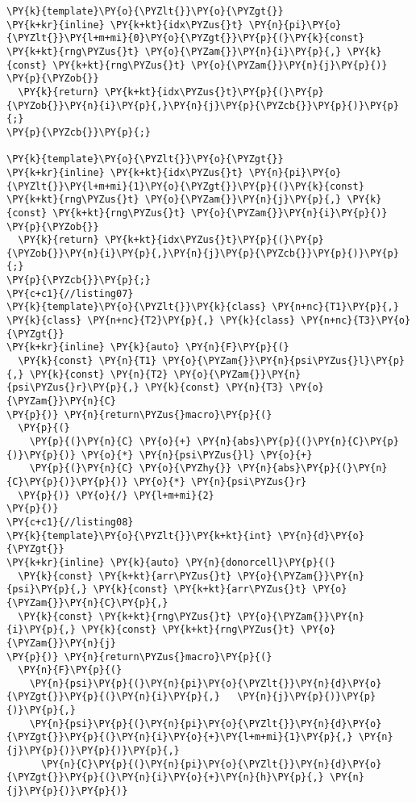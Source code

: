 \begin{Verbatim}[commandchars=\\\{\}]
\PY{k}{template}\PY{o}{\PYZlt{}}\PY{o}{\PYZgt{}}
\PY{k+kr}{inline} \PY{k+kt}{idx\PYZus{}t} \PY{n}{pi}\PY{o}{\PYZlt{}}\PY{l+m+mi}{0}\PY{o}{\PYZgt{}}\PY{p}{(}\PY{k}{const} \PY{k+kt}{rng\PYZus{}t} \PY{o}{\PYZam{}}\PY{n}{i}\PY{p}{,} \PY{k}{const} \PY{k+kt}{rng\PYZus{}t} \PY{o}{\PYZam{}}\PY{n}{j}\PY{p}{)} 
\PY{p}{\PYZob{}}
  \PY{k}{return} \PY{k+kt}{idx\PYZus{}t}\PY{p}{(}\PY{p}{\PYZob{}}\PY{n}{i}\PY{p}{,}\PY{n}{j}\PY{p}{\PYZcb{}}\PY{p}{)}\PY{p}{;}
\PY{p}{\PYZcb{}}\PY{p}{;}

\PY{k}{template}\PY{o}{\PYZlt{}}\PY{o}{\PYZgt{}}
\PY{k+kr}{inline} \PY{k+kt}{idx\PYZus{}t} \PY{n}{pi}\PY{o}{\PYZlt{}}\PY{l+m+mi}{1}\PY{o}{\PYZgt{}}\PY{p}{(}\PY{k}{const} \PY{k+kt}{rng\PYZus{}t} \PY{o}{\PYZam{}}\PY{n}{j}\PY{p}{,} \PY{k}{const} \PY{k+kt}{rng\PYZus{}t} \PY{o}{\PYZam{}}\PY{n}{i}\PY{p}{)} 
\PY{p}{\PYZob{}}
  \PY{k}{return} \PY{k+kt}{idx\PYZus{}t}\PY{p}{(}\PY{p}{\PYZob{}}\PY{n}{i}\PY{p}{,}\PY{n}{j}\PY{p}{\PYZcb{}}\PY{p}{)}\PY{p}{;}
\PY{p}{\PYZcb{}}\PY{p}{;} 
\PY{c+c1}{//listing07}
\PY{k}{template}\PY{o}{\PYZlt{}}\PY{k}{class} \PY{n+nc}{T1}\PY{p}{,} \PY{k}{class} \PY{n+nc}{T2}\PY{p}{,} \PY{k}{class} \PY{n+nc}{T3}\PY{o}{\PYZgt{}} 
\PY{k+kr}{inline} \PY{k}{auto} \PY{n}{F}\PY{p}{(}
  \PY{k}{const} \PY{n}{T1} \PY{o}{\PYZam{}}\PY{n}{psi\PYZus{}l}\PY{p}{,} \PY{k}{const} \PY{n}{T2} \PY{o}{\PYZam{}}\PY{n}{psi\PYZus{}r}\PY{p}{,} \PY{k}{const} \PY{n}{T3} \PY{o}{\PYZam{}}\PY{n}{C}
\PY{p}{)} \PY{n}{return\PYZus{}macro}\PY{p}{(}
  \PY{p}{(}
    \PY{p}{(}\PY{n}{C} \PY{o}{+} \PY{n}{abs}\PY{p}{(}\PY{n}{C}\PY{p}{)}\PY{p}{)} \PY{o}{*} \PY{n}{psi\PYZus{}l} \PY{o}{+} 
    \PY{p}{(}\PY{n}{C} \PY{o}{\PYZhy{}} \PY{n}{abs}\PY{p}{(}\PY{n}{C}\PY{p}{)}\PY{p}{)} \PY{o}{*} \PY{n}{psi\PYZus{}r}
  \PY{p}{)} \PY{o}{/} \PY{l+m+mi}{2}
\PY{p}{)}
\PY{c+c1}{//listing08}
\PY{k}{template}\PY{o}{\PYZlt{}}\PY{k+kt}{int} \PY{n}{d}\PY{o}{\PYZgt{}}  
\PY{k+kr}{inline} \PY{k}{auto} \PY{n}{donorcell}\PY{p}{(} 
  \PY{k}{const} \PY{k+kt}{arr\PYZus{}t} \PY{o}{\PYZam{}}\PY{n}{psi}\PY{p}{,} \PY{k}{const} \PY{k+kt}{arr\PYZus{}t} \PY{o}{\PYZam{}}\PY{n}{C}\PY{p}{,} 
  \PY{k}{const} \PY{k+kt}{rng\PYZus{}t} \PY{o}{\PYZam{}}\PY{n}{i}\PY{p}{,} \PY{k}{const} \PY{k+kt}{rng\PYZus{}t} \PY{o}{\PYZam{}}\PY{n}{j}
\PY{p}{)} \PY{n}{return\PYZus{}macro}\PY{p}{(}
  \PY{n}{F}\PY{p}{(}
    \PY{n}{psi}\PY{p}{(}\PY{n}{pi}\PY{o}{\PYZlt{}}\PY{n}{d}\PY{o}{\PYZgt{}}\PY{p}{(}\PY{n}{i}\PY{p}{,}   \PY{n}{j}\PY{p}{)}\PY{p}{)}\PY{p}{,} 
    \PY{n}{psi}\PY{p}{(}\PY{n}{pi}\PY{o}{\PYZlt{}}\PY{n}{d}\PY{o}{\PYZgt{}}\PY{p}{(}\PY{n}{i}\PY{o}{+}\PY{l+m+mi}{1}\PY{p}{,} \PY{n}{j}\PY{p}{)}\PY{p}{)}\PY{p}{,} 
      \PY{n}{C}\PY{p}{(}\PY{n}{pi}\PY{o}{\PYZlt{}}\PY{n}{d}\PY{o}{\PYZgt{}}\PY{p}{(}\PY{n}{i}\PY{o}{+}\PY{n}{h}\PY{p}{,} \PY{n}{j}\PY{p}{)}\PY{p}{)}

\end{Verbatim}
